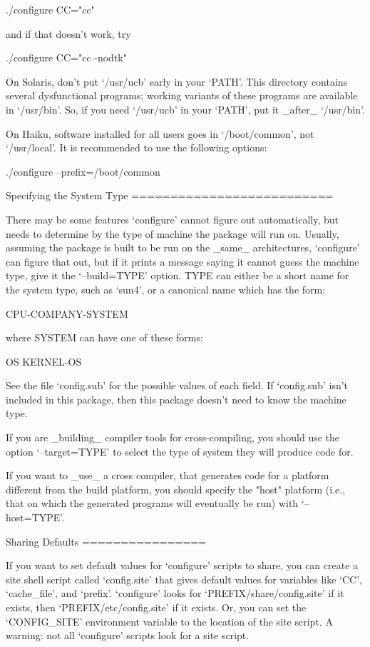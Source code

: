 \begin{DoxyCodeInclude}
     ./configure CC="cc"

and if that doesn't work, try

     ./configure CC="cc -nodtk"

   On Solaris, don't put `/usr/ucb' early in your `PATH'.  This
directory contains several dysfunctional programs; working variants of
these programs are available in `/usr/bin'.  So, if you need `/usr/ucb'
in your `PATH', put it _after_ `/usr/bin'.

   On Haiku, software installed for all users goes in `/boot/common',
not `/usr/local'.  It is recommended to use the following options:

     ./configure --prefix=/boot/common

Specifying the System Type
==========================

   There may be some features `configure' cannot figure out
automatically, but needs to determine by the type of machine the package
will run on.  Usually, assuming the package is built to be run on the
_same_ architectures, `configure' can figure that out, but if it prints
a message saying it cannot guess the machine type, give it the
`--build=TYPE' option.  TYPE can either be a short name for the system
type, such as `sun4', or a canonical name which has the form:

     CPU-COMPANY-SYSTEM

where SYSTEM can have one of these forms:

     OS
     KERNEL-OS

   See the file `config.sub' for the possible values of each field.  If
`config.sub' isn't included in this package, then this package doesn't
need to know the machine type.

   If you are _building_ compiler tools for cross-compiling, you should
use the option `--target=TYPE' to select the type of system they will
produce code for.

   If you want to _use_ a cross compiler, that generates code for a
platform different from the build platform, you should specify the
"host" platform (i.e., that on which the generated programs will
eventually be run) with `--host=TYPE'.

Sharing Defaults
================

   If you want to set default values for `configure' scripts to share,
you can create a site shell script called `config.site' that gives
default values for variables like `CC', `cache_file', and `prefix'.
`configure' looks for `PREFIX/share/config.site' if it exists, then
`PREFIX/etc/config.site' if it exists.  Or, you can set the
`CONFIG_SITE' environment variable to the location of the site script.
A warning: not all `configure' scripts look for a site script.


\end{DoxyCodeInclude}
